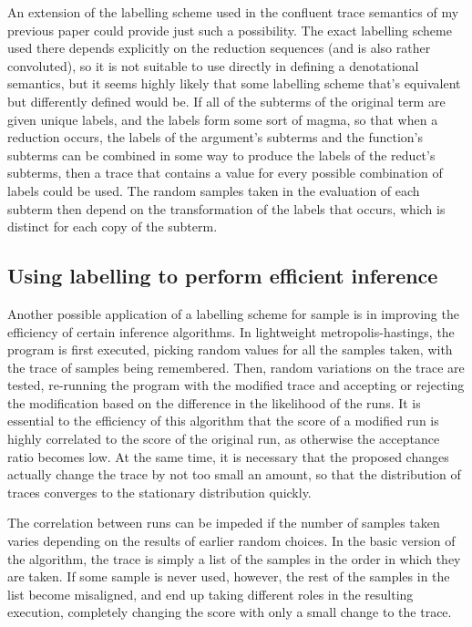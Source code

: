 \documentclass[titlepage]{article}
\begin{document}
An extension of the labelling scheme used in the confluent trace semantics of my previous paper could provide just such a possibility. The exact labelling scheme used there depends explicitly on the reduction sequences (and is also rather convoluted), so it is not suitable to use directly in defining a denotational semantics, but it seems highly likely that some labelling scheme that's equivalent but differently defined would be. If all of the subterms of the original term are given unique labels, and the labels form some sort of magma, so that when a reduction occurs, the labels of the argument's subterms and the function's subterms can be combined in some way to produce the labels of the reduct's subterms, then a trace that contains a value for every possible combination of labels could be used. The random samples taken in the evaluation of each subterm then depend on the transformation of the labels that occurs, which is distinct for each copy of the subterm.

\subsection{Using labelling to perform efficient inference}
Another possible application of a labelling scheme for sample is in improving the efficiency of certain inference algorithms. In lightweight metropolis-hastings, the program is first executed, picking random values for all the samples taken, with the trace of samples being remembered. Then, random variations on the trace are tested, re-running the program with the modified trace and accepting or rejecting the modification based on the difference in the likelihood of the runs. It is essential to the efficiency of this algorithm that the score of a modified run is highly correlated to the score of the original run, as otherwise the acceptance ratio becomes low. At the same time, it is necessary that the proposed changes actually change the trace by not too small an amount, so that the distribution of traces converges to the stationary distribution quickly.

The correlation between runs can be impeded if the number of samples taken varies depending on the results of earlier random choices. In the basic version of the algorithm, the trace is simply a list of the samples in the order in which they are taken. If some sample is never used, however, the rest of the samples in the list become misaligned, and end up taking different roles in the resulting execution, completely changing the score with only a small change to the trace.
\end{document}

